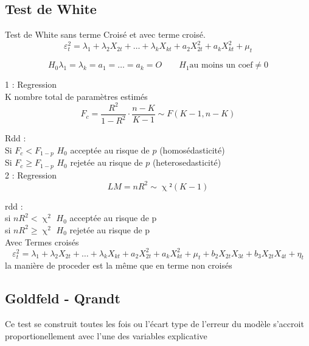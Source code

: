 \documentclass{article}
\begin{document}
\subsection{Test de White}
Test de White sans terme Croisé et avec terme croisé.
\begin{equation}
    \varepsilon_{t}^2 = \lambda_1 + \lambda_2 X_{2t} + \ldots + \lambda_k X_{kt} + a_2 X_{2t}^2
    + a_k X_{kt}^2+ \mu_t
\end{equation}

\begin{equation*}
    H_0 \lambda_1 = \lambda_k = a_1 = \ldots = a_k = O \qquad H_1 \text{au moins un coef} \neq
    0
\end{equation*}

1 : Regression \\
K nombre total de paramètres estimés
\begin{equation*}
    F_c = \frac{R^2}{1-R^2} \cdot \frac{n-K}{K-1} \sim F(K-1, n-K)
\end{equation*}

Rdd : \\
Si $F_c < F_{1-p} $ $H_0$ acceptée au risque de $p$ (homosédasticité) \\
Si $F_c \ge  F_{1-p} $ $H_0$ rejetée au risque de $p$ (heterosedasticité) \\

2 : Regression \\
\begin{equation*}
    LM = n R^2 \sim \upchi²(K-1)
\end{equation*}

rdd :\\
si $nR^2 < \upchi^2$ $H_0$ acceptée au risque de p \\
si $nR^2 \ge \upchi^2$ $H_0$ rejetée au risque de p \\

Avec Termes croisés 
\begin{equation}
    \varepsilon_{t}^2 = \lambda_1 + \lambda_2 X_{2t} + \ldots + \lambda_k X_{kt} + a_2 X_{2t}^2 +
    a_k X_{kt}^2+ \mu_t +b_2 X_{2t} X_{3t} + b_3 X_{2t} X_{4t}+\eta_t
\end{equation}
la manière de proceder est la même que en terme non croisés

\subsection{Goldfeld - Qrandt}
Ce test se construit toutes les fois ou l'écart type de l'erreur du modèle s'accroit
proportionellement avec l'une des variables explicative
\end{document}
